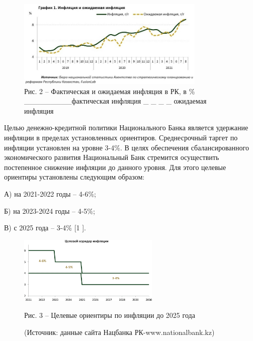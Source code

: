 \begin{figure}[H]
	\centering
	\includegraphics[width=0.8\textwidth]{assets/1118}
	\caption*{Рис. 2 -- Фактическая и ожидаемая инфляция в РК, в \% \_\_\_\_\_\_\_\_\_фактическая инфляция \_ \_ \_ \_ ожидаемая инфляция}
\end{figure}

\begin{multicols}{2}
Целью денежно-кредитной политики Национального Банка является удержание
инфляции в пределах установленных ориентиров. Среднесрочный таргет по
инфляции установлен на уровне 3-4\%. В целях обеспечения
сбалансированного экономического развития Национальный Банк стремится
осуществить постепенное снижение инфляции до данного уровня. Для этого
целевые ориентиры установлены следующим образом:

А) на 2021-2022 годы -- 4-6\%;

Б) на 2023-2024 годы -- 4-5\%;

В) с 2025 года -- 3-4\% {[}1 {]}.
\end{multicols}

\begin{figure}[H]
	\centering
	\includegraphics[width=0.6\textwidth]{assets/1119}
	\caption*{Рис. 3 -- Целевые ориентиры по инфляции до 2025 года}
	\caption*{(Источник: данные сайта Нацбанка РК-www.nationalbank.kz)}
\end{figure}

